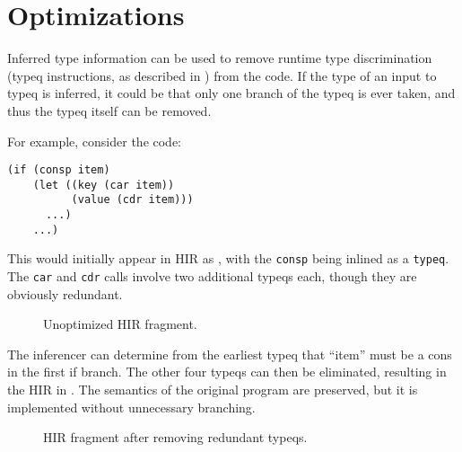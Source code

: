 \section{Optimizations}

Inferred type information can be used to remove runtime type
discrimination (typeq instructions, as described in )
from the code. If the type of an input to typeq is inferred, it could
be that only one branch of the typeq is ever taken, and thus the typeq
itself can be removed.

For example, consider the code:

\begin{verbatim}
(if (consp item)
    (let ((key (car item))
          (value (cdr item)))
      ...)
    ...)
\end{verbatim}

This would initially appear in HIR as ,
with the \texttt{consp} being inlined as a \texttt{typeq}. The
\texttt{car} and \texttt{cdr} calls involve two additional typeqs
each, though they are obviously redundant.

\begin{figure}
\begin{center}
\end{center}
\caption{\label{fig-unoptimized}
Unoptimized HIR fragment.}
\end{figure}

The inferencer can determine from the earliest typeq that ``item'' must
be a cons in the first if branch. The other four typeqs can then be
eliminated, resulting in the HIR in . The
semantics of the original program are preserved, but it is implemented
without unnecessary branching.

\begin{figure}
\begin{center}
\end{center}
\caption{\label{fig-optimized}
HIR fragment after removing redundant typeqs.}
\end{figure}
